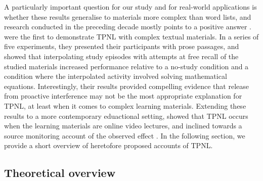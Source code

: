 \documentclass[../main.tex]{subfiles}
\begin{document}
A particularly important question for our study and for real-world applications 
is whether these results generalise to materials more complex than word lists, 
and research conducted in the preceding decade mostly points to a positive 
answer \citep{wissmanInterimTestEffect2011, divisRetrievalSpeedsContext2014, 
szpunarInterpolatedMemoryTests2013, jingInterpolatedTestingInfluences2016}. 
\cite{wissmanInterimTestEffect2011} were the first
to demonstrate TPNL with complex textual materials. In a series of five 
experiments, they presented their participants with prose passages, and showed 
that interpolating study episodes with attempts at free recall of the studied 
materials increased performance relative to a no-study condition and a 
condition where the interpolated activity involved solving mathematical 
equations. Interestingly, their results provided compelling evidence that 
release from proactive interference may not be the most appropriate explanation 
for TPNL, at least when
it comes to complex learning materials. Extending these results to a more 
contemporary eduactional setting, \cite{szpunarInterpolatedMemoryTests2013} 
showed that TPNL occurs when the learning materials are online video lectures, 
and inclined towards a source monitoring account of the observed effect 
\citep{brewerEffectsFreeRecall2010}. In the following section, we provide a 
short overview of heretofore proposed accounts of TPNL.

\hypertarget{theory}{%
\subsection{Theoretical overview}}
\end{document}
